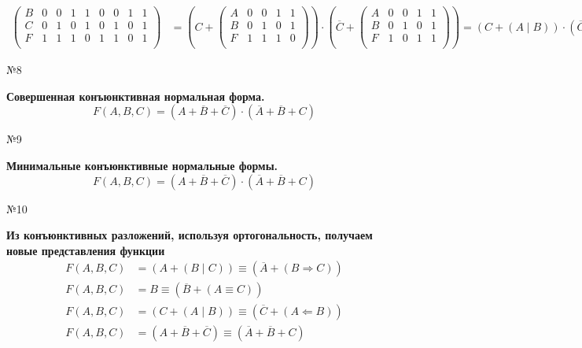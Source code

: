 \documentclass[]{article}
\begin{document}
\[\begin{aligned}
\begin{pmatrix}
		B&0&0&1&1&0&0&1&1\\
		C&0&1&0&1&0&1&0&1\\
		F&1&1&1&0&1&1&0&1\\
		\end{pmatrix}
		&=\left(C+
		\begin{pmatrix}
		A&0&0&1&1\\
		B&0&1&0&1\\
		F&1&1&1&0\\
		\end{pmatrix}
		\right)
		\cdot \left(\overline{C}+
		\begin{pmatrix}
		A&0&0&1&1\\
		B&0&1&0&1\\
		F&1&0&1&1\\
		\end{pmatrix}\right)
		=(C+(A\mid B))\cdot (\overline{C}+(A\Leftarrow B))
	\end{aligned}
	\]
	\begin{center}\begin{large}{№8}\end{large}\end{center}
	\textbf{Совершенная конъюнктивная нормальная форма.}
	\begin{equation}
	F(A,B,C)= (A+\overline{B}+\overline{C})\cdot(\overline{A}+\overline{B}+C) 
	\end{equation}
	\begin{center}\begin{large}{№9}\end{large}\end{center}
	\textbf{Минимальные конъюнктивные нормальные формы.}
	\begin{equation}
	F(A,B,C)= (A+\overline{B}+\overline{C})\cdot(\overline{A}+\overline{B}+C) 
	\end{equation}
	
	
	
	\normalsize
	
	\begin{center}\begin{large}{№10}\end{large}\end{center}
	\textbf{Из конъюнктивных разложений, используя ортогональность,
	получаем новые представления функции}
	\[
	\begin{aligned}
	F(A,B,C) &= (A+(B\mid C))\equiv(\overline{A}+(B\Rightarrow C))\\
	F(A,B,C) &= B\equiv(\overline{B}+(A\equiv C))\\
	F(A,B,C) &= (C+(A\mid B)) \equiv (\overline{C}+(A\Leftarrow B))\\
	F(A,B,C) &= (A+\overline{B}+\overline{C})\equiv(\overline{A}+\overline{B}+C) 
	\end{aligned}
	\]
	
\end{document}
